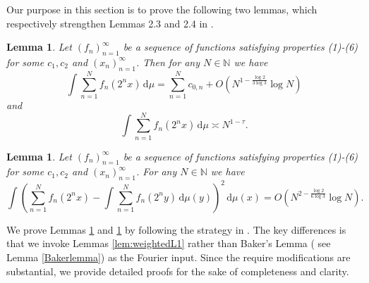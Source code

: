 \documentclass[10pt,a4paper]{amsart}
\numberwithin{equation}{section} %
\newtheorem{lem}[thm]{Lemma}
\begin{document}
Our purpose in this section  is to  prove the following two lemmas, which respectively strengthen Lemmas 2.3 and 2.4 in \cite{Baker25A}. 


\begin{lem}
	\label{Lemma1}
	Let $(f_n)_{n=1}^{\infty}$ be a sequence of functions satisfying properties (1)-(6) for some $c_{1},c_{2}$ and $(x_{n})_{n=1}^{\infty}$. Then for any $N\in\mathbb{N}$ we have 
\begin{equation}\label{eqsumfn1N}
\int \sum_{n=1}^{N}f_{n}(2^nx)\, \mathrm{d}\mu = \sum_{n=1}^{N}c_{0,n}+O\left(N^{1-\frac{\log2}{3\log3}}\log N\right)
\end{equation}
 and $$\int \sum_{n=1}^{N}f_{n}(2^nx)\, \mathrm{d}\mu \asymp N^{1-\tau}.$$
\end{lem}

\begin{lem}
	\label{Lemma2}
	Let $(f_n)_{n=1}^{\infty}$ be a sequence of functions satisfying properties (1)-(6) for some $c_{1},c_{2}$ and $(x_{n})_{n=1}^{\infty}$. For any $N\in\mathbb{N}$ we have 
	$$\int \left(\sum_{n=1}^{N}f_{n}(2^nx)-\int \sum_{n=1}^{N}f_{n}(2^ny)\, \mathrm{d}\mu(y) \right)^2\,  \mathrm{d}\mu(x)=O\left(N^{2-\frac{\log2}{6\log3}}\log N\right).$$
\end{lem}
We prove Lemmas \ref{Lemma1} and \ref{Lemma2} by following the strategy in \cite{Baker25A}. The key differences is that we invoke Lemmas \ref{lem:weightedL1} rather than Baker's Lemma ( see Lemma \ref{Bakerlemma}) as the Fourier input. Since the require modifications are substantial, we provide detailed proofs for the sake of completeness and clarity.
\end{document}
